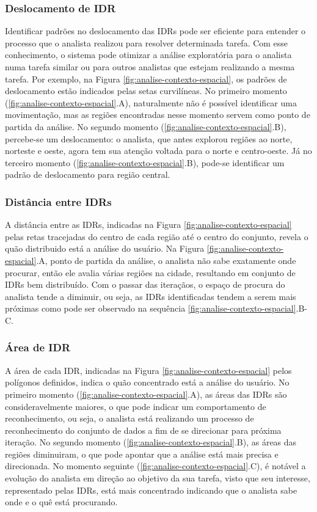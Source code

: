 \subsubsection{Deslocamento de IDR}

Identificar padrões no deslocamento das IDRs pode ser eficiente para entender o processo que o analista realizou para resolver determinada tarefa. Com esse conhecimento, o sistema pode otimizar a análise exploratória para o analista numa tarefa similar ou para outros analistas que estejam realizando a mesma tarefa. Por exemplo, na Figura \ref{fig:analise-contexto-espacial}, os padrões de deslocamento estão indicados pelas setas curvilíneas. No primeiro momento (\ref{fig:analise-contexto-espacial}.A), naturalmente não é possível identificar uma movimentação, mas as regiões encontradas nesse momento servem como ponto de partida da análise. No segundo momento (\ref{fig:analise-contexto-espacial}.B), percebe-se um deslocamento: o analista, que antes explorou regiões ao norte, norteste e oeste, agora tem sua atenção voltada para o norte e centro-oeste. Já no terceiro momento (\ref{fig:analise-contexto-espacial}.B), pode-se identificar um padrão de deslocamento para região central.

\subsubsection{Distância entre IDRs}

A distância entre as IDRs, indicadas na Figura \ref{fig:analise-contexto-espacial} pelas retas tracejadas do centro de cada região até o centro do conjunto, revela o quão distribuido está a análise do usuário. Na Figura \ref{fig:analise-contexto-espacial}.A, ponto de partida da análise, o analista não sabe exatamente onde procurar, então ele avalia várias regiões na cidade, resultando em conjunto de IDRs bem distribuído. Com o passar das iteraçãos, o espaço de procura do analista tende a diminuir, ou seja, as IDRs identificadas tendem a serem mais próximas como pode ser observado na sequência \ref{fig:analise-contexto-espacial}.B-C.

\subsubsection{Área de IDR}

A área de cada IDR, indicadas na Figura \ref{fig:analise-contexto-espacial} pelos polígonos definidos, indica o quão concentrado está a análise do usuário. No primeiro momento (\ref{fig:analise-contexto-espacial}.A), as áreas das IDRs são consideravelmente maiores, o que pode indicar um comportamento de reconhecimento, ou seja, o analista está realizando um processo de reconhecimento do conjunto de dados a fim de se direcionar para próxima iteração. No segundo momento (\ref{fig:analise-contexto-espacial}.B), as áreas das regiões diminuiram, o que pode apontar que a análise está mais precisa e direcionada. No momento seguinte (\ref{fig:analise-contexto-espacial}.C), é notável a evolução do analista em direção ao objetivo da sua tarefa, visto que seu interesse, representado pelas IDRs, está mais concentrado indicando que o analista sabe onde e o quê está procurando.

